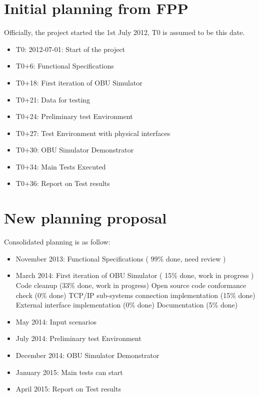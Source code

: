 \documentclass{template/openetcs_article}
\begin{document}


\section{Initial planning from FPP}
	Officially, the project started the 1st July 2012, T0 is assumed to be this date.
	\begin{itemize}
		\item T0: 2012-07-01: Start of the project
		\item T0+6: Functional Specifications
		\item T0+18: First iteration of OBU Simulator
		\item T0+21: Data for testing
		\item T0+24: Preliminary test Environment
		\item T0+27: Test Environment with physical interfaces
		\item T0+30: OBU Simulator Demonstrator
		\item T0+34: Main Tests Executed
		\item T0+36: Report on Test results
	\end{itemize}

\section{New planning proposal}
	Consolidated planning is as follow:
	
	\begin{itemize}
		\item November 2013: Functional Specifications ( 99\% done, need review )
		\item March 2014: First iteration of OBU Simulator ( 15\% done, work in progress )
			\subitem Code cleanup (33\% done, work in progress)
			\subitem Open source code conformance check (0\% done)
			\subitem TCP/IP sub-systems connection implementation (15\% done)
			\subitem External interface implementation (0\% done)
			\subitem Documentation (5\% done)
		\item May 2014: Input scenarios
		\item July 2014: Preliminary test Environment
		\item December 2014: OBU Simulator Demonstrator
		\item January 2015: Main tests can start
		\item April 2015: Report on Test results
	\end{itemize}
	

\end{document}
